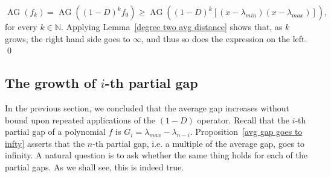 \documentclass[11pt]{article}
\DeclareMathOperator{\AG}{AG}
\begin{document}
\[\AG(f_k)= \AG((1-D)^kf_0)\geq\AG((1-D)^k [(x-\lambda_{min})(x-\lambda_{max})]),\]
for every $k\in\mathbb{N}$. Applying Lemma~\ref{degree two avg distance} shows that, as $k$ grows, the right hand side goes to $\infty$, and thus so does the expression on the left. \qed

\subsection{The growth of $i$-th partial gap}
In the previous section, we concluded that the average gap increases without bound upon repeated applications of the $(1-D)$ operator. Recall that the $i$-th partial gap of a polynomial $f$ is $G_i = \lambda_{max} - \lambda_{n-i}$. Proposition~\ref{avg gap goes to infty} asserts that the $n$-th partial gap, i.e. a multiple of the average gap, goes to infinity. A natural question is to ask whether the same thing holds for each of the partial gaps. As we shall see, this is indeed true.
\end{document}
